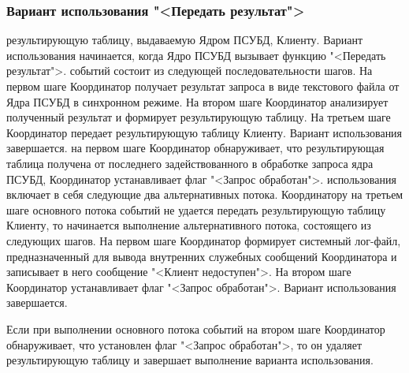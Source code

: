 \documentclass[11pt,oneside]{article}
\begin{document}
\subsubsection{Вариант использования "<Передать результат">}
 результирующую таблицу, выдаваемую Ядром ПСУБД, Клиенту. Вариант использования начинается, когда Ядро ПСУБД вызывает функцию "<Передать результат">.
 событий состоит из следующей последовательности шагов. На первом шаге Координатор получает результат запроса в виде текстового файла от Ядра ПСУБД в синхронном режиме. На втором шаге Координатор анализирует полученный результат и формирует результирующую таблицу. На третьем шаге Координатор передает результирующую таблицу Клиенту. Вариант использования завершается.
 на первом шаге Координатор обнаруживает, что результирующая таблица получена от последнего задействованного в обработке запроса ядра ПСУБД, Координатор устанавливает флаг "<Запрос обработан">.
 использования включает в себя следующие два альтернативных потока.
 Координатору на третьем шаге основного потока событий не удается передать результирующую таблицу Клиенту, то начинается выполнение альтернативного потока, состоящего из следующих шагов. На первом шаге Координатор формирует системный лог-файл, предназначенный для вывода внутренних служебных сообщений Координатора и записывает в него сообщение "<Клиент недоступен">. На втором шаге Координатор устанавливает флаг "<Запрос обработан">. Вариант использования завершается.
\par Если при выполнении основного потока событий на втором шаге Координатор обнаруживает, что установлен флаг "<Запрос обработан">, то он удаляет результирующую таблицу и завершает выполнение варианта использования.
\end{document}
